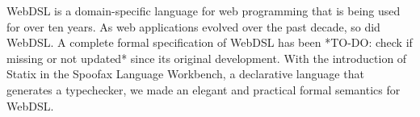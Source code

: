 
WebDSL is a domain-specific language for web programming that is being used for over ten years. As web applications evolved over the past decade, so did WebDSL. A complete formal specification of WebDSL has been *TO-DO: check if missing or not updated* since its original development. With the introduction of Statix in the Spoofax Language Workbench, a declarative language that generates a typechecker, we made an elegant and practical formal semantics for WebDSL.
